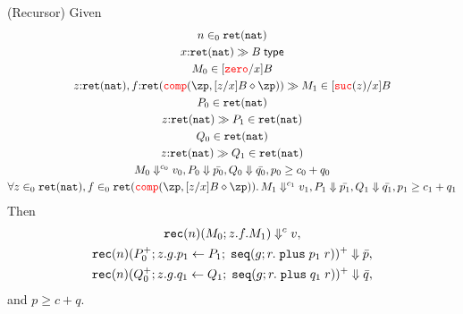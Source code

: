 \iffalse
\begin{lemma}(Recursor)
  Given 
  \begin{gather*}
    \isVal{n}{\ret{\nat}}\\
    \openTypeComp{\isOf{x}{\ret{\nat}}}{B}\\
    \isComp{M_0}{[\zero/x]B}\\
    \openComp{\isOf{z}{\ret{\nat}}, \isOf{f}{\ret{\ccomp{\zp}{[z/x]B}{\zp}}}}{M_1}{[\suc{z}/x]B}\\
    \isComp{P_0}{\ret{\nat}}\\
    \openComp{\isOf{z}{\ret{\nat}}}{P_1}{\ret{\nat}}\\
    \isComp{Q_0}{\ret{\nat}}\\
    \openComp{\isOf{z}{\ret{\nat}}}{Q_1}{\ret{\nat}}\\
    \evalCost{M_0}{c_0}{v_0}, \eval{P_0}{\bar{p_0}}, \eval{Q_0}{\bar{q_0}}, 
    p_0 \ge c_0 + q_0\\
    \forall \isVal{z}{\ret{\nat}}, \isVal{f}{\ret{\ccomp{\zp}{[z/x]B}{\zp}}}.\,
    \evalCost{M_1}{c_1}{v_1}, \eval{P_1}{\bar{p_1}}, \eval{Q_1}{\bar{q_1}},
    p_1 \ge c_1 + q_1
  \end{gather*}
  Then 
  \begin{gather*}
  \evalCost{\rec{n}{M_0}{z}{f}{M_1}}{c}{v},\\
    \eval{\rec{n}{P_0^+}{z}{g}{\bind{P_1}{p_1}{\seq{g}{r}{\plus\;p_1\;r}}}^+}{\bar{p}},\\
    \eval{\rec{n}{Q_0^+}{z}{g}{\bind{Q_1}{q_1}{\seq{g}{r}{\plus\;q_1\;r}}}^+}{\bar{q}}, 
  \end{gather*}
  and $p \ge c + q$.
\end{lemma}

